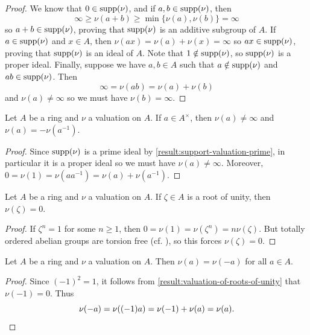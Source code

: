 \begin{proof}
We know that $0 \in \operatorname{supp}(\nu)$, and if $a, b \in \operatorname{supp}(\nu)$, then
\[ \infty \geq \nu(a+b) \geq \min\{\nu(a), \nu(b)\} = \infty \]
so $a+b \in \operatorname{supp}(\nu)$, proving that $\operatorname{supp}(\nu)$ is an additive subgroup of $A$. If $a \in \operatorname{supp}(\nu)$ and $x \in A$, then $\nu(ax) = \nu(a) + \nu(x) = \infty$ so $ax \in \operatorname{supp}(\nu)$, proving that $\operatorname{supp}(\nu)$ is an ideal of $A$. Note that $1 \notin \operatorname{supp}(\nu)$, so $\operatorname{supp}(\nu)$ is a proper ideal. Finally, suppose we have $a, b \in A$ such that $a \notin \operatorname{supp}(\nu)$ and $ab \in \operatorname{supp}(\nu)$. Then
\[ \infty = \nu(ab) = \nu(a) + \nu(b) \]
and $\nu(a) \neq \infty$ so we must have $\nu(b) = \infty$. 
\end{proof}

\begin{lemma}
\label{result:valuation-of-inverse}
Let $A$ be a ring and $\nu$ a valuation on $A$. If $a \in A^\times$, then $\nu(a) \neq \infty$ and $\nu(a) = -\nu(a^{-1})$. 
\end{lemma}

\begin{proof}
Since $\operatorname{supp}(\nu)$ is a prime ideal by \cref{result:support-valuation-prime}, in particular it is a proper ideal so we must have $\nu(a) \neq \infty$. Moreover, $0 = \nu(1) = \nu(aa^{-1}) = \nu(a) + \nu(a^{-1})$.
\end{proof}

\begin{lemma}
\label{result:valuation-of-roots-of-unity}
Let $A$ be a ring and $\nu$ a valuation on $A$. If $\zeta \in A$ is a root of unity, then $\nu(\zeta) = 0$. 
\end{lemma}

\begin{proof}
If $\zeta^n = 1$ for some $n \geq 1$, then $0 = \nu(1) = \nu(\zeta^n) = n\nu(\zeta)$.
But totally ordered abelian groups are torsion free (cf. ), so this forces $\nu(\zeta) = 0$. 
\end{proof}

\begin{lemma}
\label{result:valuation-of-negative}
Let $A$ be a ring and $\nu$ a valuation on $A$. Then $\nu(a) = \nu(-a)$ for all $a \in A$.
\end{lemma}

\begin{proof}
Since $(-1)^2 = 1$, it follows from \cref{result:valuation-of-roots-of-unity} that $\nu(-1) = 0$. Thus 
\[ \nu(-a) = \nu((-1)a) = \nu(-1) + \nu(a) = \nu(a). \qedhere \]
\end{proof}

